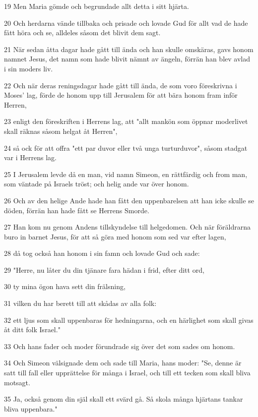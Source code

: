 \par 19 Men Maria gömde och begrundade allt detta i sitt hjärta.
\par 20 Och herdarna vände tillbaka och prisade och lovade Gud för allt vad de hade fått höra och se, alldeles såsom det blivit dem sagt.
\par 21 När sedan åtta dagar hade gått till ända och han skulle omskäras, gavs honom namnet Jesus, det namn som hade blivit nämnt av ängeln, förrän han blev avlad i sin moders liv.
\par 22 Och när deras reningsdagar hade gått till ända, de som voro föreskrivna i Moses' lag, förde de honom upp till Jerusalem för att bära honom fram inför Herren,
\par 23 enligt den föreskriften i Herrens lag, att "allt mankön som öppnar moderlivet skall räknas såsom helgat åt Herren",
\par 24 så ock för att offra "ett par duvor eller två unga turturduvor", såsom stadgat var i Herrens lag.
\par 25 I Jerusalem levde då en man, vid namn Simeon, en rättfärdig och from man, som väntade på Israels tröst; och helig ande var över honom.
\par 26 Och av den helige Ande hade han fått den uppenbarelsen att han icke skulle se döden, förrän han hade fått se Herrens Smorde.
\par 27 Han kom nu genom Andens tillskyndelse till helgedomen. Och när föräldrarna buro in barnet Jesus, för att så göra med honom som sed var efter lagen,
\par 28 då tog också han honom i sin famn och lovade Gud och sade:
\par 29 "Herre, nu låter du din tjänare fara hädan i frid, efter ditt ord,
\par 30 ty mina ögon hava sett din frälsning,
\par 31 vilken du har berett till att skådas av alla folk:
\par 32 ett ljus som skall uppenbaras för hedningarna, och en härlighet som skall givas åt ditt folk Israel."
\par 33 Och hans fader och moder förundrade sig över det som sades om honom.
\par 34 Och Simeon välsignade dem och sade till Maria, hans moder: "Se, denne är satt till fall eller upprättelse för många i Israel, och till ett tecken som skall bliva motsagt.
\par 35 Ja, också genom din själ skall ett svärd gå. Så skola många hjärtans tankar bliva uppenbara."
